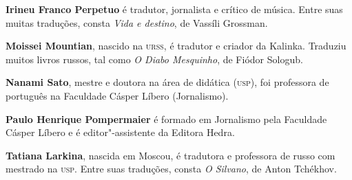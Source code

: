 \noindent{}

\noindent\textbf{Irineu Franco Perpetuo} é tradutor, jornalista e crítico de música. Entre suas muitas traduções, consta \textit{Vida e destino}, de Vassíli Grossman.

\noindent\textbf{Moissei Mountian}, nascido na \textsc{urss}, é tradutor e criador da Kalinka. Traduziu muitos livros russos, tal como \textit{O Diabo Mesquinho}, de Fiódor Sologub.

\noindent\textbf{Nanami Sato}, mestre e doutora na área de didática (\textsc{usp}), foi professora de português na Faculdade Cásper Líbero (Jornalismo).

\noindent\textbf{Paulo Henrique Pompermaier} é formado em Jornalismo pela Faculdade Cásper Líbero e é editor"-assistente da Editora Hedra.

\noindent\textbf{Tatiana Larkina}, nascida em Moscou, é tradutora e professora de russo com mestrado na \textsc{usp}. Entre suas traduções, consta \textit{O Silvano}, de Anton Tchékhov.

